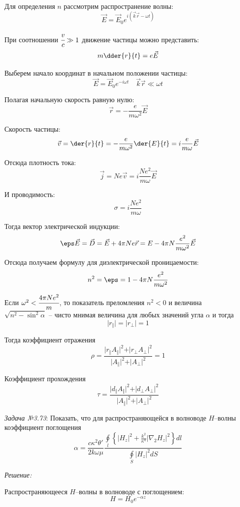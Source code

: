 Для определения \( n \) рассмотрим распространение волны:
\[
	\vec{E} = \vec{E}_0 e^{i(\vec{k}\vec{r} - \omega t)}
\]

При соотношении \( \cfrac{v}{c} \gg 1 \) движение частицы можно представить:
\[
	m\dder{r}{t} = e\vec{E}
\]

Выберем начало координат в начальном положении частицы:
\[
	\vec{E} = \vec{E}_0 e^{-i\omega t} \quad \vec{k}\vec{r} \ll \omega t
\]

Полагая начальную скорость равную нулю:
\[
	\vec{r} = -\frac{e}{m\omega^2}\vec{E}
\]

Скорость частицы:
\[
	\vec{v} = \der{r}{t} = -\frac{e}{m\omega^2}\der{E}{t} = i\frac{e}{m\omega}\vec{E}
\]

Отсюда плотность тока:
\[
	\vec{j} = Ne\vec{v} = i\frac{Ne^2}{m\omega}\vec{E}
\]

И проводимость:
\[
	\sigma = i\frac{Ne^2}{m\omega}
\]

Тогда вектор электрической индукции:
\[
	\eps\vec{E} = \vec{D} = \vec{E} + 4\pi N e \vec{r} = 
		E - 4\pi N \frac{e^2}{m\omega^2}\vec{E} 
\]

Отсюда получаем формулу для диэлектрической проницаемости:
\[
	n^2 = \eps = 1 - 4\pi N \frac{e^2}{m\omega^2}
\]

Если \( \omega^2 < \cfrac{4\pi Ne^2}{m} \), то показатель преломления 
\( n^2 < 0 \) и величина \\ \( \sqrt{n^2 - \sin^2\alpha} \) -- чисто мнимая 
величина для любых значений угла \( \alpha \) и тогда
\[
	\vert r_{\Vert} \vert = \vert r_{\bot} \vert = 1 
\]

Тогда коэффициент отражения
\[
	\rho = \frac{\vert r_{\Vert} A_{\Vert} \vert^2 + 
		\vert r_{\bot} A_{\bot} \vert^2}{ \vert A_{\Vert} \vert^2 + 
		\vert A_{\bot} \vert^2} = 1
\]

Коэффициент прохождения
\[
	\tau = \frac{\vert d_{\Vert} A_{\Vert} \vert^2 + 
		\vert d_{\bot} A_{\bot} \vert^2}{ \vert A_{\Vert} \vert^2 + 
		\vert A_{\bot} \vert^2}
\]

\newpage

\emph{Задача №3.73}: Показать, что для распространяющейся в волноводе 
\( H \)--волны коэффициент поглощения
\[
	\alpha = \frac{c\kappa^2\theta'}{2k\omega\mu}
	\frac{\oint\limits_{l} 
		\left\{ |H_z|^2 + \frac{k^2}{\kappa^4}|\nabla_2 H_z|^2 \right\}dl
	}{\oint\limits_{S} |H_z|^2 dS}
\]

\emph{Решение:}

Распространяющееся \( H \)--волны в волноводе с поглощением:
\[
	H = H_0 e^{-\alpha z}
\]

